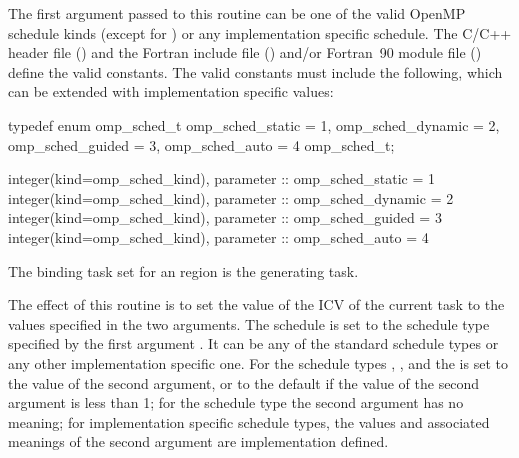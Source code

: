 \constraints
The first argument passed to this routine can be one of the valid OpenMP schedule kinds
(except for ) or any implementation specific schedule. The C/C++ header file
() and the Fortran include file () and/or Fortran~90 module file
() define the valid constants. The valid constants must include the following,
which can be extended with implementation specific values:

\begin{ccppspecific}
\begin{ompcEnum}
typedef enum omp_sched_t {
  omp_sched_static = 1,
  omp_sched_dynamic = 2,
  omp_sched_guided = 3,
  omp_sched_auto = 4
} omp_sched_t;
\end{ompcEnum}
\end{ccppspecific}

\begin{samepage}
\begin{fortranspecific}
\begin{ompfEnum}
integer(kind=omp_sched_kind), parameter :: omp_sched_static = 1
integer(kind=omp_sched_kind), parameter :: omp_sched_dynamic = 2
integer(kind=omp_sched_kind), parameter :: omp_sched_guided = 3
integer(kind=omp_sched_kind), parameter :: omp_sched_auto = 4
\end{ompfEnum}
\end{fortranspecific}
\end{samepage}

\binding
The binding task set for an  region is the generating task.

\effect
The effect of this routine is to set the value of the  ICV of the current task
to the values specified in the two arguments. The schedule is set to the schedule type
specified by the first argument . It can be any of the standard schedule types or
any other implementation specific one. For the schedule types , , and
 the  is set to the value of the second argument, or to the default
 if the value of the second argument is less than 1; for the schedule type
 the second argument has no meaning; for implementation specific schedule types,
the values and associated meanings of the second argument are implementation defined.

